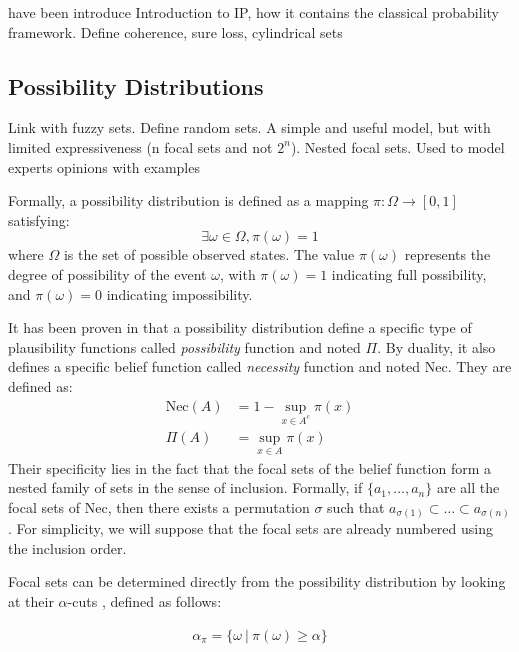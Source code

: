 have been introduce Introduction to IP, how it contains the classical probability framework.
Define coherence, sure loss, cylindrical sets
\subsection{Possibility Distributions}\label{sec:possibilities}
Link with fuzzy sets. Define random sets. A simple and useful model, but with limited expressiveness (n focal sets and not $2^n$). Nested focal sets. Used to model experts opinions with examples \cite{baudrit_joint_2007}

Formally, a possibility distribution is defined as a mapping $\pi: \Omega \rightarrow [0,1]$ satisfying:
\begin{equation}
	\exists \omega \in \Omega, \pi(\omega) = 1 \label{eq:possibility}
\end{equation}
where $\Omega$ is the set of possible observed states. The value $\pi(\omega)$ represents the degree of possibility of the event $\omega$, with $\pi(\omega) = 1$ indicating full possibility, and $\pi(\omega) = 0$ indicating impossibility.

It has been proven in \cite{dubois_when_1992} that a possibility distribution define a specific type of plausibility functions called \textit{possibility} function and noted \(\Pi\). By duality, it also defines a specific belief function called \textit{necessity} function and noted \(\mathrm{Nec}\). They are defined as:
\begin{align}
    \mathrm{Nec}(A)&=1-\sup_{x\in A^c}\pi(x)\label{eq:bel_pl}\\
    \Pi(A) &= \sup_{x\in A}\pi(x)
\end{align}
Their specificity lies in the fact that the focal sets of the belief function form a nested family of sets in the sense of inclusion. Formally, if \( \{a_1,\dots,a_n\} \) are all the focal sets of \(\mathrm{Nec}\), then there exists a permutation $\sigma$ such that \( a_{\sigma(1)}\subset\dots\subset a_{\sigma(n)}\). For simplicity, we will suppose that the focal sets are already numbered using the inclusion order.

Focal sets can be determined directly from the possibility distribution by looking at their \( \alpha \)-cuts \cite{destercke_unifying_2008}, defined as follows:

\begin{align}
    \alpha_\pi=\{\omega~|~\pi(\omega)\geqslant\alpha\} \label{eq:alpha_cut}   
\end{align}

